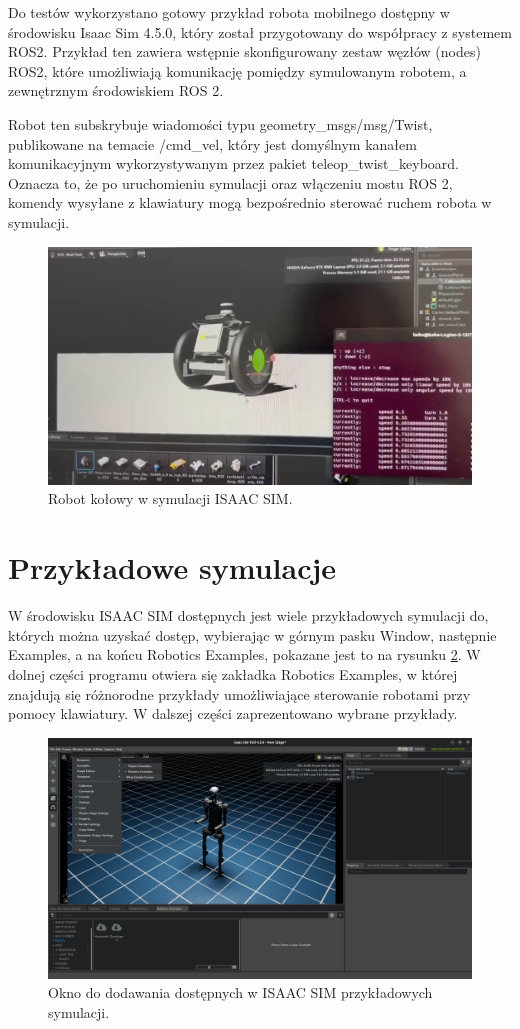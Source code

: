 \documentclass[12pt]{article}
\begin{document}
Do testów wykorzystano gotowy przykład robota mobilnego dostępny w środowisku Isaac Sim 4.5.0, który został przygotowany do współpracy z systemem ROS2. Przykład ten zawiera wstępnie skonfigurowany zestaw węzłów (nodes) ROS2, które umożliwiają komunikację pomiędzy symulowanym robotem, a zewnętrznym środowiskiem ROS 2.

Robot ten subskrybuje wiadomości typu geometry\_msgs/msg/Twist, publikowane na temacie /cmd\_vel, który jest domyślnym kanałem komunikacyjnym wykorzystywanym przez pakiet teleop\_twist\_keyboard. Oznacza to, że po uruchomieniu symulacji oraz włączeniu mostu ROS 2, komendy wysyłane z klawiatury mogą bezpośrednio sterować ruchem robota w symulacji.

\begin{figure}[h]
    \centering
    \includegraphics[width=0.5\linewidth]{Zdjęcia/robocikRos2.png}
    \caption{Robot kołowy w symulacji ISAAC SIM.}
    \label{fig:robotKolowy}
\end{figure}

\section{Przykładowe symulacje}

W środowisku ISAAC SIM dostępnych jest wiele przykładowych symulacji do, których można uzyskać dostęp, wybierając w górnym pasku Window, następnie Examples, a na końcu Robotics Examples, pokazane jest to na rysunku \ref{fig:symulacje}.
W dolnej części programu otwiera się zakładka Robotics Examples, w której znajdują się różnorodne przykłady umożliwiające sterowanie robotami przy pomocy klawiatury. W dalszej części zaprezentowano wybrane przykłady.



\begin{figure}[h]
    \centering
    \includegraphics[width=0.8\linewidth]{Zdjęcia/oknoZPrzykladami.png}
    \caption{Okno do dodawania dostępnych w ISAAC SIM przykładowych symulacji.}
    \label{fig:symulacje}
\end{figure}
\end{document}
